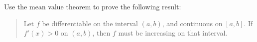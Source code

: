 \documentclass{ximera}
\author{Steven Gubkin}
\begin{document}
\begin{exercise}



Use the mean value theorem to prove the following result:

\begin{quote}
  Let $f$ be differentiable on the interval $(a,b)$, and continuous on
  $[a,b]$. If $f'(x)>0$ on $(a,b)$, then $f$ must be increasing on
  that interval.
\end{quote}

\end{exercise}
\end{document}
